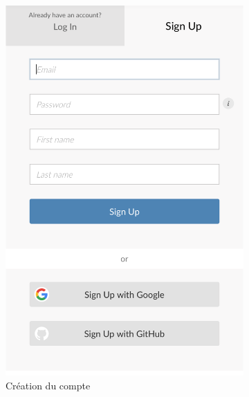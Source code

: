 \documentclass[10.5pt,a4paper]{article}
\begin{document}
\begin{figure}[H]
\centering
\begin{subfigure}{.5\textwidth}
  \centering
  \includegraphics[width=1\linewidth]{_graphs/login.png}
  \caption{Création du compte}
  \label{login}
\end{subfigure}%
\begin{subfigure}{.5\textwidth}
  \centering

\end{subfigure}
\end{figure}
\end{document}
